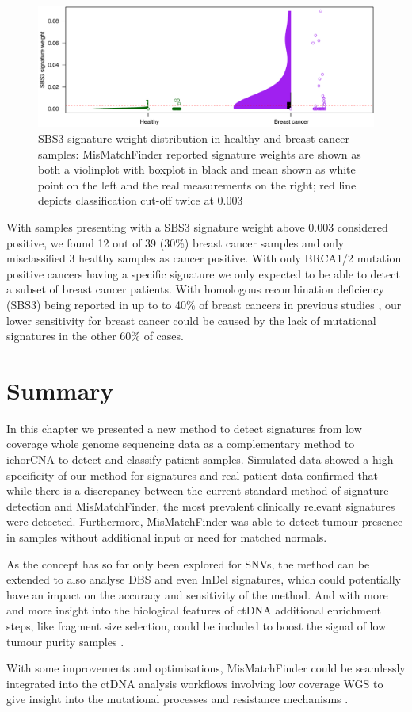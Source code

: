 \begin{figure}[ht]
\centering
\includegraphics[width=.99\linewidth]{Figures/MisMatchFinder/SBS3Distributions.pdf}
\caption[SBS3 signature weight distribution in healthy and breast cancer samples]{SBS3 signature weight distribution in healthy and breast cancer samples: MisMatchFinder reported signature weights are shown as both a violinplot with boxplot in black and mean shown as white point on the left and the real measurements on the right; red line depicts classification cut-off twice at 0.003}\label{fig:mmf-SBS3distribution}
\end{figure}

With samples presenting with a SBS3 signature weight above 0.003 considered positive, we found 12 out of 39 (30\%) breast cancer samples and only misclassified 3 healthy samples as cancer positive. With only BRCA1/2 mutation positive cancers having a specific signature we only expected to be able to detect a subset of breast cancer patients. With homologous recombination deficiency (SBS3) being reported in up to to 40\% of breast cancers in previous studies \cite{AkashiTanaka2015}, our lower sensitivity for breast cancer could be caused by the lack of mutational signatures in the other 60\% of cases.

\section{Summary}
In this chapter we presented a new method to detect signatures from low coverage whole genome sequencing data as a complementary method to ichorCNA to detect and classify patient samples. Simulated data showed a high specificity of our method for signatures and real patient data confirmed that while there is a discrepancy between the current standard method of signature detection and MisMatchFinder, the most prevalent clinically relevant signatures were detected. Furthermore, MisMatchFinder was able to detect tumour presence in samples without additional input or need for matched normals.

As the concept has so far only been explored for SNVs, the method can be extended to also analyse DBS and even InDel signatures, which could potentially have an impact on the accuracy and sensitivity of the method.
And with more and more insight into the biological features of ctDNA additional enrichment steps, like fragment size selection, could be included to boost the signal of low tumour purity samples \cite{Mouliere2018,Markus2022}.

With some improvements and optimisations, MisMatchFinder could be seamlessly integrated into the ctDNA analysis workflows involving low coverage WGS to give insight into the mutational processes and resistance mechanisms \cite{Homburger2019,Chen2021}.
